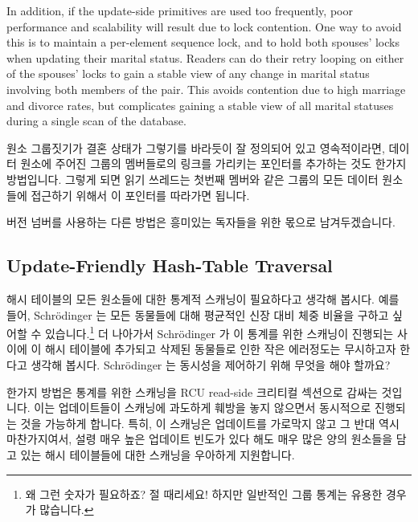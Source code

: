 In addition, if the update-side primitives are used too frequently,
poor performance and scalability will result due to lock contention.
One way to avoid this is to maintain a per-element sequence lock,
and to hold both spouses' locks when updating their marital status.
Readers can do their retry looping on either of the spouses' locks
to gain a stable view of any change in marital status involving both
members of the pair.
This avoids contention due to high marriage and divorce rates, but
complicates gaining a stable view of all marital statuses during a
single scan of the database.
\fi

원소 그룹짓기가 결혼 상태가 그렇기를 바라듯이 잘 정의되어 있고 영속적이라면,
데이터 원소에 주어진 그룹의 멤버들로의 링크를 가리키는 포인터를 추가하는 것도
한가지 방법입니다.
그렇게 되면 읽기 쓰레드는 첫번째 멤버와 같은 그룹의 모든 데이터 원소들에
접근하기 위해서 이 포인터를 따라가면 됩니다.

버전 넘버를 사용하는 다른 방법은 흥미있는 독자들을 위한 몫으로 남겨두겠습니다.
\iffalse

If the element groupings are well-defined and persistent, which marital
status is hoped to be,
then one approach is to add pointers to the data elements to link
together the members of a given group.
Readers can then traverse these pointers to access all the data elements
in the same group as the first one located.

Other approaches using version numbering are left as exercises for the
interested reader.
\fi

\subsection{Update-Friendly Hash-Table Traversal}
\label{sec:together:Update-Friendly Hash-Table Traversal}

해시 테이블의 모든 원소들에 대한 통계적 스캐닝이 필요하다고 생각해 봅시다.
예를 들어, Schr\"odinger 는 모든 동물들에 대해 평균적인 신장 대비 체중 비율을
구하고 싶어할 수 있습니다.\footnote{
	왜 그런 숫자가 필요하죠?
	절 때리세요!
	하지만 일반적인 그룹 통계는 유용한 경우가 많습니다.}
더 나아가서 Schr\"odinger 가 이 통계를 위한 스캐닝이 진행되는 사이에 이 해시
테이블에 추가되고 삭제된 동물들로 인한 작은 에러정도는 무시하고자 한다고 생각해
봅시다.
Schr\"odinger 는 동시성을 제어하기 위해 무엇을 해야 할까요?

한가지 방법은 통계를 위한 스캐닝을 RCU read-side 크리티컬 섹션으로 감싸는
것입니다.
이는 업데이트들이 스캐닝에 과도하게 훼방을 놓지 않으면서 동시적으로 진행되는
것을 가능하게 합니다.
특히, 이 스캐닝은 업데이트를 가로막지 않고 그 반대 역시 마찬가지여서, 설령 매우
높은 업데이트 빈도가 있다 해도 매우 많은 양의 원소들을 담고 있는 해시
테이블들에 대한 스캐닝을 우아하게 지원합니다.
\iffalse

